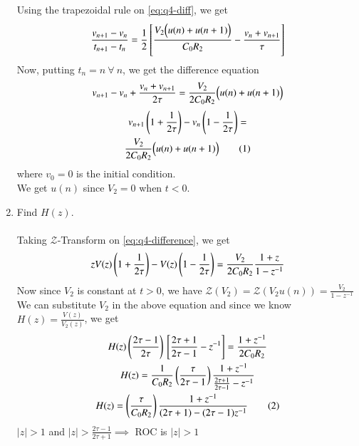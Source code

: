 \documentclass[journal,12pt,twocolumn]{IEEEtran}
\renewcommand\thesection{\arabic{section}}
\begin{document}
\begin{enumerate}[label=\arabic*.,ref=\thesection.\theenumi]
	Using the trapezoidal rule on \eqref{eq:q4-diff}, we get
	\[ \frac{v_{n+1} - v_n}{t_{n+1} - t_n} = \frac{1}{2} {}\left[\frac{V_2 \Big{(}u(n) + u(n+1)\Big{)} }
		{C_0R_2} - \frac{v_n + v_{n+1}}{\tau} \right] \]
	Now, putting \( t_n = n \ \forall\ n \), we get the difference equation
	\begin{multline*}
		v_{n+1} - v_n  + \frac{v_n + v_{n+1}}{2\tau} = 
			\frac{V_2}{2C_0 R_2} \Big{(}u(n) + u(n+1)\Big{)}
	\end{multline*}
	\begin{multline*}
		v_{n+1}\brak{1 + \frac{1}{2\tau}} - v_n\brak{1 - \frac{1}{2\tau}} = \\
			\frac{V_2}{2C_0 R_2} \Big{(}u(n) + u(n+1)\Big{)} \numberthis \label{eq:q4-difference}
	\end{multline*}
	where \( v_0 = 0 \) is the initial condition. \\
	We get \( u(n) \) since \( V_2 = 0 \) when \( t < 0 \). \\
	

\item Find $H(z)$. \\
	\solution \\
	Taking \( \mathcal{Z} \)-Transform on \eqref{eq:q4-difference}, we get
	\[ z V(z) \left(1 + \frac{1}{2\tau}\right) - V(z)\left(1 - \frac{1}{2\tau}\right)
		= \frac{V_2}{2C_0R_2} \frac{1 + z}{1 - z^{-1}} \]
	Now since \( V_2 \) is constant at \( t > 0 \), we have 
	\( \mathcal{Z} (V_2) = \mathcal{Z}(V_2 u(n)) = \frac{V_2}{1 - z^{-1}} \) \\
	We can substitute \( V_2 \) in the above equation and since
		we know \( H(z) = \frac{V(z)}{V_2(z)} \), we get
	\begin{gather*}
	    H(z) \brak{\frac{2 \tau - 1}{2\tau}} \sbrak{\frac{2\tau + 1}{2\tau - 1} - z^{-1}}
		= \frac{1 + z^{-1}}{2C_0 R_2}\\
	    H(z) =  \frac{1}{C_0 R_2} \brak{\frac{\tau}{2\tau - 1} }
		\frac{1 + z^{-1}}{\frac{2\tau+1}{2\tau-1} - z^{-1} }\\
	    H(z) = \brak{\frac{\tau}{C_0 R_2}} \frac{1 + z^{-1}}{(2\tau+1) - (2\tau-1)z^{-1}}
		\numberthis \label{eq:q4-Hz}\\
	\end{gather*}
	\( |z| > 1 \) and \( |z| > \frac{2\tau-1}{2\tau+1} \implies \) ROC is \( |z| > 1 \) \\



\end{enumerate}
\end{document}
